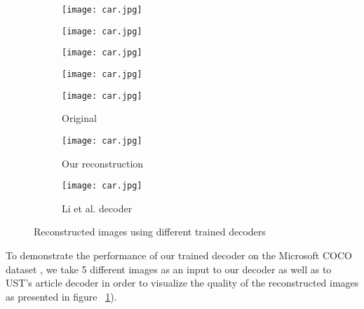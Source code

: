 \begin{figure}[h!]
\begin{subfigure}[b]{0.3\linewidth}
		\texttt{[image: car.jpg]} %
	\end{subfigure}
	\centering
	\begin{subfigure}[b]{0.3\linewidth}
		\texttt{[image: car.jpg]} %
	\end{subfigure}
	\begin{subfigure}[b]{0.3\linewidth}
		\texttt{[image: car.jpg]} %
	\end{subfigure}
	\begin{subfigure}[b]{0.3\linewidth}
		\texttt{[image: car.jpg]} %
	\end{subfigure}
		\centering
	\begin{subfigure}[b]{0.3\linewidth}
		\texttt{[image: car.jpg]} %
		\caption{Original}
	\end{subfigure}
	\begin{subfigure}[b]{0.3\linewidth}
		\texttt{[image: car.jpg]} %
		\caption{Our reconstruction}
	\end{subfigure}
	\begin{subfigure}[b]{0.3\linewidth}
		\texttt{[image: car.jpg]} %
		\caption{Li et al. \cite{bib11} decoder}	
	\end{subfigure}
	\caption{Reconstructed images using different trained decoders}
	\label{fig:reconstruction}
\end{figure}
To demonstrate the performance of our trained decoder on the Microsoft COCO dataset \cite{bib10}, we take 5 different images as an input to our decoder as well as to UST's article decoder in order to visualize the quality of the reconstructed images as presented in figure ~\ref{fig:reconstruction}).\newline

